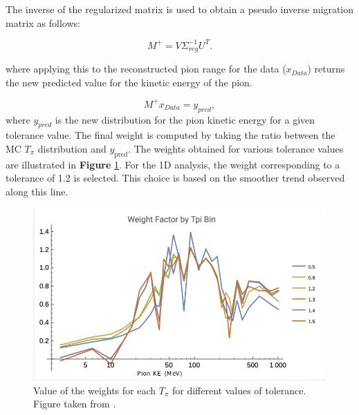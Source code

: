 The inverse of the regularized matrix is used to obtain a pseudo inverse migration matrix as follows:

\begin{equation}
    M^+ = V\Sigma^{-1}_{reg} U^T.
\end{equation}

where applying this to the reconstructed pion range for the data ($x_{Data}$) returns the new predicted value for the kinetic energy of the pion. 

\begin{equation}
    M^+ x_{Data} = y_{pred},
\end{equation}
 where $y_{pred}$ is the new distribution for the pion kinetic energy for a given tolerance value. The final weight is computed by taking the ratio between the MC $T_\pi$ distribution and $y_{\text{pred}}$. The weights obtained for various tolerance values are illustrated in \textbf{Figure} \ref{fig:Simulation:MnvGENIETunes:PionReweight:TpiWeight}. For the 1D analysis, the weight corresponding to a tolerance of 1.2 is selected. This choice is based on the smoother trend observed along this line.
 

\begin{figure}[!htb]
    \centering
    \includegraphics[scale=0.4]{Figures/Chapter3/TpiWeight.png}
    \caption{Value of the weights for each $T_\pi$ for different values of tolerance. Figure taken from \cite{PionReweight}.}
    \label{fig:Simulation:MnvGENIETunes:PionReweight:TpiWeight}
\end{figure}

